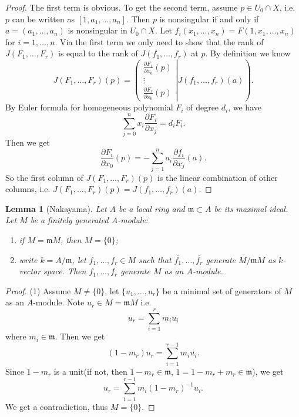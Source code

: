 \documentclass{amsart}
\theoremstyle{plain}
\newtheorem{lemma}{Lemma}
\theoremstyle{definition}
\theoremstyle{remark}
\numberwithin{equation}{section}
\begin{document}
\begin{proof}
	The first  term is obvious. To get the second term, assume $ p\in U_0\cap X $, i.e. $ p $ can be written as $ [1,a_1,\dots,a_n] $. Then $ p $ is nonsingular if and only if $ a=(a_1,\dots,a_n) $ is nonsingular in $ U_0\cap X $. Let $ f_i(x_1,\dots,x_n)=F(1,x_1,\dots,x_n) $ for $ i=1,\dots,n $. Via the first term we only need to show that the rank of $ J(F_1,\dots,F_r) $ is equal to the rank of $ J(f_1,\dots,f_r) $ at $ p $. By definition we know
	$$
	J(F_1,\dots,F_r)(p)=\left( \left.\begin{matrix}
	\frac{\partial F_1}{\partial x_0}(p) \\
	\vdots\\
	\frac{\partial F_r}{\partial x_0}(p)
	\end{matrix}\right| J(f_1,\dots,f_r)(a) \right).
	$$
	By Euler formula for homogeneous polynomial $ F_i $ of degree $ d_i $, we have 
	$$
	\sum\limits_{j=0}^n x_i\frac{\partial F_i}{\partial x_j}= d_iF_i.
	$$
	Then we get 
	$$
	\frac{\partial F_i}{\partial x_0}(p)=-\sum\limits_{j=1}^n a_i\frac{\partial f_i}{\partial x_j}(a).
	$$
	So the first column of $ J(F_1,\dots,F_r)(p) $ is the linear combination of other columns, i.e. $ J(F_1,\dots,F_r)(p)=J(f_1,\dots,f_r)(a) $.
\end{proof}
\begin{lemma}[Nakayama]
	Let $ A $ be a local ring and $ \mathfrak{m}\subset A $ be its maximal ideal. Let $ M $ be a finitely generated $ A $-module:
	\begin{enumerate}
		\item if $ M=\mathfrak{m}M $, then $ M=\lbrace 0 \rbrace $;
		\item write $ k=A/\mathfrak{m} $, let $ f_1,\dots,f_r\in M $ such that $ \bar{f_1},\dots,\bar{f_r} $ generate $ M/\mathfrak{m}M $ as $ k $-vector space. Then $ f_1,\dots,f_r $ generate $ M $ as an  $ A $-module.
	\end{enumerate}
\end{lemma}
\begin{proof}
	(1) Assume $ M\neq \lbrace 0 \rbrace $, let $ \lbrace u_1,\dots,u_r\rbrace $ be a minimal set of generators of $ M $ as an $ A $-module.  Note $ u_r\in M=\mathfrak{m}M $ i.e.
	$$
	u_r=\sum\limits_{i=1}^{r}m_iu_i
	$$
	where $ m_i\in \mathfrak{m} $. Then we get
	$$
	(1-m_r)u_r=\sum\limits_{i=1}^{r-1}m_iu_i.
	$$
	Since $ 1-m_r $ is a unit(if not, then $ 1-m_r \in \mathfrak{m} $, $ 1=1-m_r+m_r\in \mathfrak{m} $), we get
	$$
	u_r=\sum\limits_{i=1}^{r-1}m_i(1-m_r)^{-1}u_i.
	$$ 
 We get a contradiction, thus $ M=\lbrace 0 \rbrace $.
\end{proof}
\end{document}
